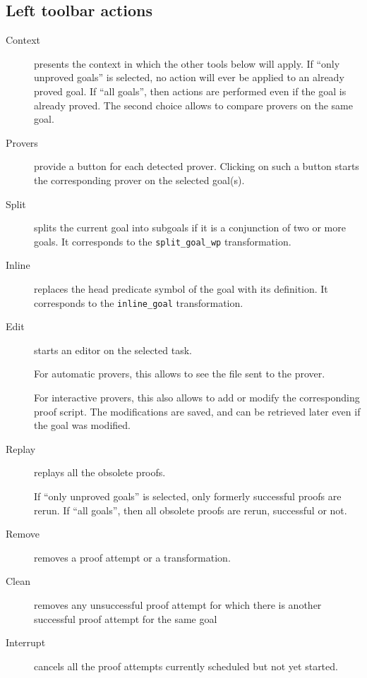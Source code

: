 
\subsection{Left toolbar actions}

\begin{description}
\item[Context] presents the context in which the other tools below will
  apply. If ``only unproved goals'' is selected, no action will ever
  be applied to an already proved goal.  If ``all goals'', then
  actions are performed even if the goal is already proved. The second
  choice allows to compare provers on the same goal.

\item[Provers] provide a button for each detected prover. Clicking on such a
  button starts the corresponding prover on the selected goal(s).

\item[Split] splits the current goal into subgoals if it is a
  conjunction of two or more goals. It corresponds to the
  \verb|split_goal_wp| transformation.

\item[Inline] replaces the head predicate symbol of the goal with its
  definition. It corresponds to the
  \verb|inline_goal| transformation.

\item[Edit] starts an editor on the selected task.

  For automatic provers, this allows to see the file sent to the
  prover.

  For interactive provers, this also allows to add or modify the
  corresponding proof script. The modifications are saved, and can be
  retrieved later even if the goal was modified.

\item[Replay] replays all the obsolete proofs.

  If ``only unproved goals'' is selected, only formerly successful
  proofs are rerun. If ``all goals'', then all obsolete proofs are
  rerun, successful or not.

\item[Remove] removes a proof attempt or a transformation.

\item[Clean] removes any unsuccessful proof attempt for which there is
  another successful proof attempt for the same goal

\item[Interrupt] cancels all the proof attempts currently scheduled
  but not yet started.

\end{description}

